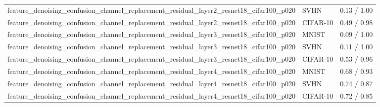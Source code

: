\begin{tabular}{lll}
feature\_denoising\_confusion\_channel\_replacement\_residual\_layer2\_resnet18\_cifar100\_p020 & SVHN & 0.13 / 1.00 \\
feature\_denoising\_confusion\_channel\_replacement\_residual\_layer2\_resnet18\_cifar100\_p020 & CIFAR-10 & 0.49 / 0.98 \\
feature\_denoising\_confusion\_channel\_replacement\_residual\_layer3\_resnet18\_cifar100\_p020 & MNIST & 0.09 / 1.00 \\
feature\_denoising\_confusion\_channel\_replacement\_residual\_layer3\_resnet18\_cifar100\_p020 & SVHN & 0.11 / 1.00 \\
feature\_denoising\_confusion\_channel\_replacement\_residual\_layer3\_resnet18\_cifar100\_p020 & CIFAR-10 & 0.53 / 0.96 \\
feature\_denoising\_confusion\_channel\_replacement\_residual\_layer4\_resnet18\_cifar100\_p020 & MNIST & 0.68 / 0.93 \\
feature\_denoising\_confusion\_channel\_replacement\_residual\_layer4\_resnet18\_cifar100\_p020 & SVHN & 0.74 / 0.87 \\
feature\_denoising\_confusion\_channel\_replacement\_residual\_layer4\_resnet18\_cifar100\_p020 & CIFAR-10 & 0.72 / 0.85 \\
\bottomrule
\end{tabular}
